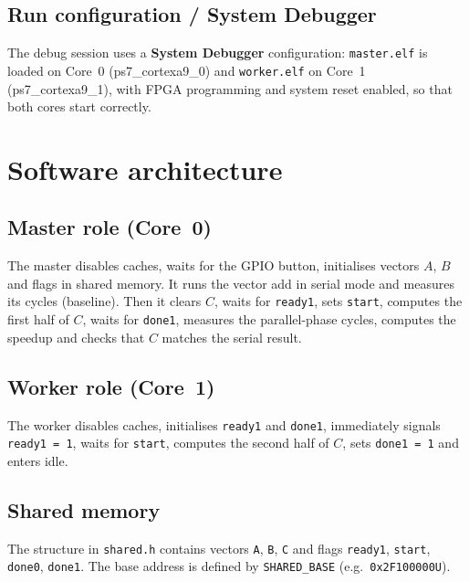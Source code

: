 \documentclass[11pt,a4paper]{article}
\begin{document}
\subsection{Run configuration / System Debugger}
The debug session uses a \textbf{System Debugger} configuration: \texttt{master.elf} is loaded on Core~0 (ps7\_cortexa9\_0) and \texttt{worker.elf} on Core~1 (ps7\_cortexa9\_1), with FPGA programming and system reset enabled, so that both cores start correctly.

\newpage
\section{Software architecture}

\subsection{Master role (Core~0)}
The master disables caches, waits for the GPIO button, initialises vectors $A$, $B$ and flags in shared memory. It runs the vector add in serial mode and measures its cycles (baseline). Then it clears $C$, waits for \texttt{ready1}, sets \texttt{start}, computes the first half of $C$, waits for \texttt{done1}, measures the parallel-phase cycles, computes the speedup and checks that $C$ matches the serial result.

\subsection{Worker role (Core~1)}
The worker disables caches, initialises \texttt{ready1} and \texttt{done1}, immediately signals \texttt{ready1 = 1}, waits for \texttt{start}, computes the second half of $C$, sets \texttt{done1 = 1} and enters idle.

\subsection{Shared memory}
The structure in \texttt{shared.h} contains vectors \texttt{A}, \texttt{B}, \texttt{C} and flags \texttt{ready1}, \texttt{start}, \texttt{done0}, \texttt{done1}. The base address is defined by \texttt{SHARED\_BASE} (e.g.\ \texttt{0x2F100000U}).
\end{document}
